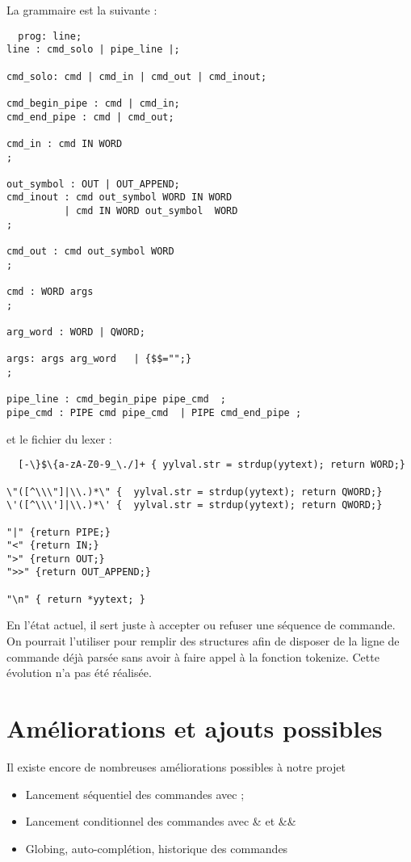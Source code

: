 \documentclass[fr]{article}
\begin{document}
La grammaire est la suivante :
\begin{lstlisting}
  prog: line;
line : cmd_solo | pipe_line |;

cmd_solo: cmd | cmd_in | cmd_out | cmd_inout;

cmd_begin_pipe : cmd | cmd_in;
cmd_end_pipe : cmd | cmd_out;

cmd_in : cmd IN WORD 
;

out_symbol : OUT | OUT_APPEND;
cmd_inout : cmd out_symbol WORD IN WORD
          | cmd IN WORD out_symbol  WORD 
;

cmd_out : cmd out_symbol WORD 
;

cmd : WORD args 
;

arg_word : WORD | QWORD;

args: args arg_word   | {$$="";}
;

pipe_line : cmd_begin_pipe pipe_cmd  ;
pipe_cmd : PIPE cmd pipe_cmd  | PIPE cmd_end_pipe ;
\end{lstlisting}

et le fichier du lexer :

\begin{lstlisting}
  [-\}$\{a-zA-Z0-9_\./]+ { yylval.str = strdup(yytext); return WORD;}

\"([^\\\"]|\\.)*\" {  yylval.str = strdup(yytext); return QWORD;}
\'([^\\\']|\\.)*\' {  yylval.str = strdup(yytext); return QWORD;}

"|" {return PIPE;}
"<" {return IN;}
">" {return OUT;}
">>" {return OUT_APPEND;}

"\n" { return *yytext; } 
\end{lstlisting}
En l'état actuel, il sert juste à accepter ou refuser une séquence de
commande. On pourrait l'utiliser pour remplir des structures afin de 
disposer de la ligne de commande déjà parsée sans avoir à faire appel
à la fonction tokenize. Cette évolution n'a pas été réalisée.
\section{Améliorations et ajouts possibles}
Il existe encore de nombreuses améliorations possibles à notre projet
\begin{itemize}
  \item Lancement séquentiel des commandes avec ;
  \item Lancement conditionnel des commandes avec \& et \&\&
  \item Globing, auto-complétion, historique des commandes
\end{itemize}
\end{document}
